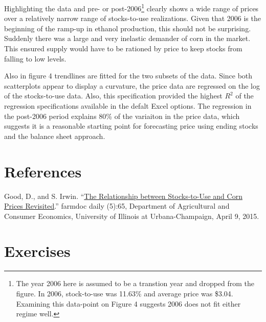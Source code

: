 \documentclass[
  letterpaper,
  DIV=11,
  numbers=noendperiod]{scrreprt}
\begin{document}
Highlighting the data and pre- or post-2006\footnote{The year 2006 here
  is assumed to be a transtion year and dropped from the figure. In
  2006, stock-to-use was 11.63\% and average price was \$3.04. Examining
  this data-point on Figure 4 suggests 2006 does not fit either regime
  well.} clearly shows a wide range of prices over a relatively narrow
range of stocks-to-use realizations. Given that 2006 is the beginning of
the ramp-up in ethanol production, this should not be surprising.
Suddenly there was a large and very inelastic demander of corn in the
market. This ensured supply would have to be rationed by price to keep
stocks from falling to low levels.

Also in figure 4 trendlines are fitted for the two subsets of the data.
Since both scatterplots appear to display a curvature, the price data
are regressed on the log of the stocks-to-use data. Also, this
specification provided the highest \(R^2\) of the regression
specifications available in the defalt Excel options. The regression in
the post-2006 period explains 80\% of the variaiton in the price data,
which suggests it is a reasonable starting point for forecasting price
using ending stocks and the balance sheet approach.

\hypertarget{references}{%
\section{References}\label{references}}

Good, D., and S. Irwin.
``\href{http://farmdocdaily.illinois.edu/2015/04/relationship-stock-to-use-and-corn-prices.html}{The
Relationship between Stocks-to-Use and Corn Prices Revisited}.'' farmdoc
daily (5):65, Department of Agricultural and Consumer Economics,
University of Illinois at Urbana-Champaign, April 9, 2015.

\hypertarget{exercises-4}{%
\section{Exercises}\label{exercises-4}}
\end{document}
